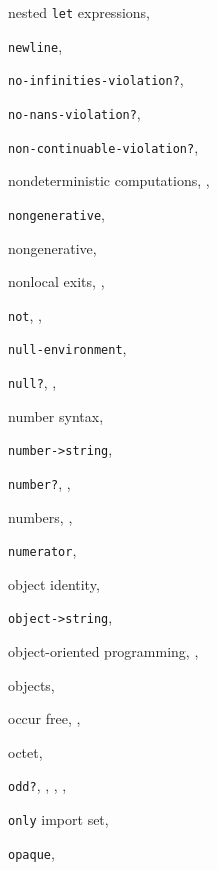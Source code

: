 {\begin{multicols}{2}
nested \texttt{let} expressions, \pageref{binding_s19}
  
\texttt{newline}, \textit{\pageref{io_s87}}
  
\texttt{no-infinities-violation?}, \textit{\pageref{exceptions_s44}}
  
\texttt{no-nans-violation?}, \textit{\pageref{exceptions_s45}}
  
\texttt{non-continuable-violation?}, \textit{\pageref{exceptions_s27}}
  
nondeterministic computations, \pageref{examples_s87}, \pageref{examples_s95}
  
\texttt{nongenerative}, \textit{\pageref{records_s16}}
  
nongenerative, \pageref{records_s5}
  
nonlocal exits, \pageref{control_s55}, \pageref{control_s60}
  
\texttt{not}, \pageref{start_s100}, \textit{\pageref{control_s10}}
  
\texttt{null-environment}, \textit{\pageref{control_s82}}
  
\texttt{null?}, \pageref{start_s113}, \textit{\pageref{objects_s15}}
  
number syntax, \pageref{grammar_s18}
  
\texttt{number-\textgreater{}string}, \textit{\pageref{objects_s148}}
  
\texttt{number?}, \pageref{start_s120}, \textit{\pageref{objects_s17}}
  
numbers, \pageref{start_s5}, \pageref{objects_s63}
  
\texttt{numerator}, \textit{\pageref{objects_s118}}
  
object identity, \pageref{objects_s11}
  
\texttt{object-\textgreater{}string}, \pageref{io_s40}
  
object-oriented programming, \pageref{syntax_s66}, \pageref{examples_s61}
  
objects, \pageref{intro_s1}
  
occur free, \pageref{start_s67}, \pageref{start_s75}
  
octet, \pageref{io_s8}
  
\texttt{odd?}, \pageref{start_s159}, \pageref{further_s38}, \pageref{further_s83}, \textit{\pageref{objects_s96}}
  
\texttt{only} import set, \pageref{libraries_s9}
  
\texttt{opaque}, \textit{\pageref{records_s16}}
  

\end{multicols}}
